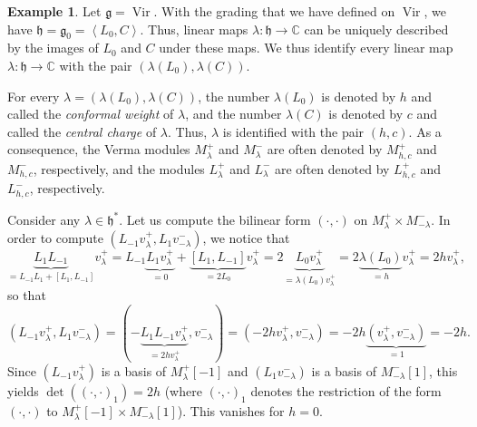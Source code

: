 \documentclass
[numbers=enddot,12pt,final,onecolumn,german,notitlepage]{scrartcl}%
\theoremstyle{definition}
\newtheorem{example}[theo]{Example}
\begin{document}
\begin{example}
\label{exa.Vir}Let $\mathfrak{g}=\operatorname*{Vir}$. With the grading that
we have defined on $\operatorname*{Vir}$, we have $\mathfrak{h}=\mathfrak{g}%
_{0}=\left\langle L_{0},C\right\rangle $. Thus, linear maps $\lambda
:\mathfrak{h}\rightarrow\mathbb{C}$ can be uniquely described by the images of
$L_{0}$ and $C$ under these maps. We thus identify every linear map
$\lambda:\mathfrak{h}\rightarrow\mathbb{C}$ with the pair $\left(
\lambda\left(  L_{0}\right)  ,\lambda\left(  C\right)  \right)  $.

For every $\lambda=\left(  \lambda\left(  L_{0}\right)  ,\lambda\left(
C\right)  \right)  $, the number $\lambda\left(  L_{0}\right)  $ is denoted by
$h$ and called the \textit{conformal weight} of $\lambda$, and the number
$\lambda\left(  C\right)  $ is denoted by $c$ and called the \textit{central
charge} of $\lambda$. Thus, $\lambda$ is identified with the pair $\left(
h,c\right)  $. As a consequence, the Verma modules $M_{\lambda}^{+}$ and
$M_{\lambda}^{-}$ are often denoted by $M_{h,c}^{+}$ and $M_{h,c}^{-}$,
respectively, and the modules $L_{\lambda}^{+}$ and $L_{\lambda}^{-}$ are
often denoted by $L_{h,c}^{+}$ and $L_{h,c}^{-}$, respectively.

Consider any $\lambda\in\mathfrak{h}^{\ast}$. Let us compute the bilinear form
$\left(  \cdot,\cdot\right)  $ on $M_{\lambda}^{+}\times M_{-\lambda}^{-}$. In
order to compute $\left(  L_{-1}v_{\lambda}^{+},L_{1}v_{-\lambda}^{-}\right)
$, we notice that
\[
\underbrace{L_{1}L_{-1}}_{=L_{-1}L_{1}+\left[  L_{1},L_{-1}\right]
}v_{\lambda}^{+}=L_{-1}\underbrace{L_{1}v_{\lambda}^{+}}_{=0}%
+\underbrace{\left[  L_{1},L_{-1}\right]  }_{=2L_{0}}v_{\lambda}%
^{+}=2\underbrace{L_{0}v_{\lambda}^{+}}_{=\lambda\left(  L_{0}\right)
v_{\lambda}^{+}}=2\underbrace{\lambda\left(  L_{0}\right)  }_{=h}v_{\lambda
}^{+}=2hv_{\lambda}^{+},
\]
so that%
\[
\left(  L_{-1}v_{\lambda}^{+},L_{1}v_{-\lambda}^{-}\right)  =\left(
-\underbrace{L_{1}L_{-1}v_{\lambda}^{+}}_{=2hv_{\lambda}^{+}},v_{-\lambda}%
^{-}\right)  =\left(  -2hv_{\lambda}^{+},v_{-\lambda}^{-}\right)
=-2h\underbrace{\left(  v_{\lambda}^{+},v_{-\lambda}^{-}\right)  }_{=1}=-2h.
\]
Since $\left(  L_{-1}v_{\lambda}^{+}\right)  $ is a basis of $M_{\lambda}%
^{+}\left[  -1\right]  $ and $\left(  L_{1}v_{-\lambda}^{-}\right)  $ is a
basis of $M_{-\lambda}^{-}\left[  1\right]  $, this yields $\det\left(
\left(  \cdot,\cdot\right)  _{1}\right)  =2h$ (where $\left(  \cdot
,\cdot\right)  _{1}$ denotes the restriction of the form $\left(  \cdot
,\cdot\right)  $ to $M_{\lambda}^{+}\left[  -1\right]  \times M_{-\lambda}%
^{-}\left[  1\right]  $). This vanishes for $h=0$.


\end{example}
\end{document}
